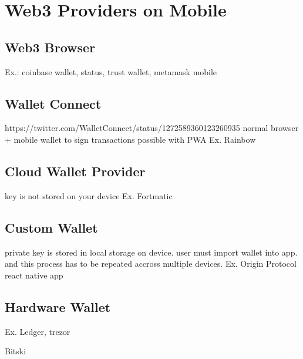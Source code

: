 \section{Web3 Providers on Mobile}

\subsection{Web3 Browser}
Ex.: coinbase wallet, status, trust wallet, metamask mobile

\subsection{Wallet Connect}
https://twitter.com/WalletConnect/status/1272589360123260935
normal browser + mobile wallet to sign transactions
possible with PWA
Ex. Rainbow

\subsection{Cloud Wallet Provider}
key is not stored on your device
Ex. Fortmatic


\subsection{Custom Wallet}
private key is stored in local storage on device. user must import wallet into app. and this process has to be repeated accross multiple devices. 
Ex. Origin Protocol react native app

\subsection{Hardware Wallet}
Ex. Ledger, trezor


Bitski
